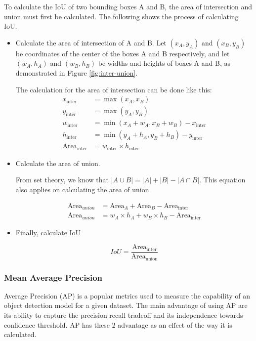  
  
  To calculate the IoU of two bounding boxes A and B, the area of intersection and union must first
  be calculated. The following shows the process of calculating IoU.
  \begin{itemize}[topsep=0pt]
    \item Calculate the area of intersection of A and B. 
    Let $(x_A,y_A)$ and $(x_B,y_B)$ be coordinates of the center of the boxes A and B respectively,
    and let $(w_A,h_A)$ and $(w_B,h_B)$ be widths and heights of boxes A and B, as demonstrated in Figure \ref{fig:inter-union}.

    The calculation for the area of intersection can be done like this:
    \begin{align*}
      x_{\text{{inter}}} &= \max(x_A, x_B) \\
      y_{\text{{inter}}} &= \max(y_A, y_B) \\
      w_{\text{{inter}}} &= \min(x_A + w_A, x_B + w_B) - x_{\text{{inter}}} \\
      h_{\text{{inter}}} &= \min(y_A + h_A, y_B + h_B) - y_{\text{{inter}}} \\
      \text{Area}_{\text{inter}} &= w_{\text{{inter}}} \times h_{\text{{inter}}}
    \end{align*}

    \item Calculate the area of union.

    From set theory, we know that $|A \cup B| =|A| + |B| - |A \cap B| $.
    This equation also applies on calculating the area of union.

    \begin{align*}
      \text{Area}_{union} &= \text{Area}_A + \text{Area}_B - \text{Area}_{\text{inter}}\\
      \text{Area}_{union} &= w_A\times h_A + w_B\times h_B  - \text{Area}_{\text{inter}}
    \end{align*}

    \item Finally, calculate IoU

    \begin{equation}
      IoU = \frac{\text{Area}_{\text{inter}}}{\text{Area}_{\text{union}}}
    \end{equation}
  \end{itemize} 

  

  \subsubsection{Mean Average Precision}
  Average Precision (AP) is a popular metrics used to measure the capability of an object detection model
  for a given dataset. The main advantage of using AP are its ability to capture the precision recall
  tradeoff and its independence towards confidence threshold. AP has these 2 advantage as an effect of the way 
  it is calculated.

